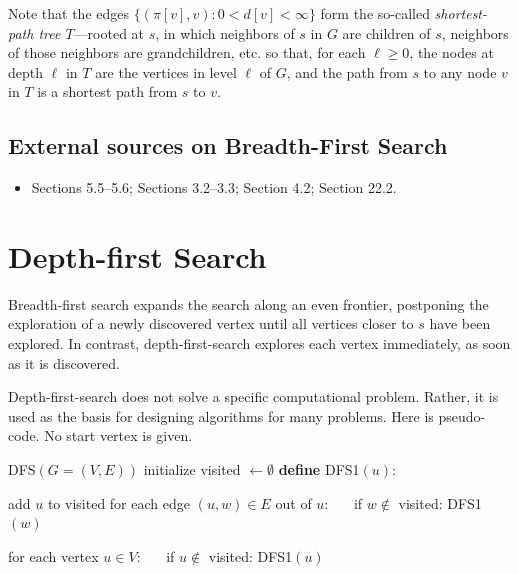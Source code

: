 \documentclass[11pt]{article}
\begin{document}
Note that the edges $\{(\pi[v], v) : 0 < d[v] <\infty\}$ form
the so-called \emph{shortest-path tree $T$}---rooted at $s$, in which neighbors of $s$ in $G$
are children of $s$, neighbors of those neighbors are grandchildren, etc.
so that, for each $\ell\ge 0$, the nodes at depth $\ell$ in $T$ are the vertices in level $\ell$ of $G$,
and the path from $s$ to any node $v$ in $T$ is a shortest path from $s$ to $v$.


\subsection*{External sources on Breadth-First Search}
\begin{itemize}
\item \JE Sections 5.5--5.6; \KT Sections 3.2--3.3; \DPV Section 4.2; \CLRS Section 22.2.
\end{itemize}


\section{Depth-first Search}\label{graphs: sec: DFS}

Breadth-first search expands the search along an even frontier,
postponing the exploration of a newly discovered vertex
until all vertices closer to $s$ have been explored.
In contrast, depth-first-search explores each vertex immediately,
as soon as it is discovered.

Depth-first-search does not solve a specific computational problem.
Rather, it is used as the basis for designing algorithms for many problems.
Here is pseudo-code.  No start vertex is given.

\begin{myframed}
  \begin{steps}
  \item[] {\sf DFS}$(G=(V,E))$ 
    \step initialize {\sf visited} $\leftarrow \emptyset$
    \smallskip 
    \step \textbf{define} {\sf DFS1}$(u)$:
    \begin{block}
      \step add $u$ to {\sf visited}
      \step for each edge $(u, w)\in E$ out of $u$:
      \step~~~if $w \not\in$ {\sf visited}:  {\sf DFS1}$(w)$
    \end{block}
    \smallskip 
    \step for each vertex $u\in V$: 
    \step~~~if $u \not\in$ {\sf visited}:  {\sf DFS1}$(u)$
  \end{steps}
\end{myframed}
\end{document}
